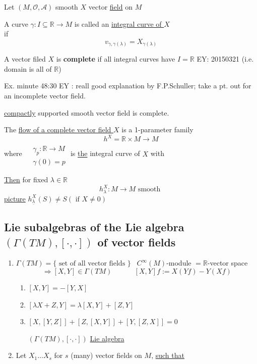 	Let $(M,\mathcal{O},\mathcal{A})$ smooth $X$ vector \underline{field} on $M$
	
	\begin{definition}
		A curve $\gamma :I \subseteq \mathbb{R} \to M$ is called an \underline{integral curve of $X$} \\
		if 
		\[
		v_{\gamma,\gamma(\lambda)} = X_{\gamma(\lambda)}
		\]
	\end{definition}
	
	\begin{definition} A vector filed $X$ is \textbf{complete} if all integral curves have $I = \mathbb{R}$ EY: 20150321 (i.e. domain is all of $\mathbb{R}$)
	\end{definition}
	
	Ex. minute 48:30 EY : reall good explanation by F.P.Schuller; take a pt. out for an incomplete vector field.
	
	\begin{theorem}
		\underline{compactly} supported smooth vector field is complete.  
	\end{theorem}
	
	\begin{definition} The \underline{flow of a complete vector field $X$} is a 1-parameter family
		\[
		h^X = \mathbb{R}\times M \to M
		\]
		where $\begin{aligned} & \quad \\ 
		& \gamma_p : \mathbb{R} \to M \\
		& \gamma(0) = p \end{aligned}$ is \underline{the} integral curve of $X$ with 
		
		\underline{Then} for fixed $\lambda \in \mathbb{R}$ 
		\[
		h_{\lambda}^X : M \to M \text{ smooth }
		\]
		\underline{picture}  $h^X_{\underline{\lambda}}(S) \neq S (\text{ if } X \neq 0 )$
	\end{definition}
	
	\subsection{Lie subalgebras of the Lie algebra $(\Gamma(TM) , [ \cdot , \cdot ] )$ of vector fields}
	
	\begin{enumerate}
		\item[(a)] $\Gamma(TM) = \lbrace \text{ set of all vector fields } \rbrace$ \quad \, $C^{\infty}(M)$-module $ = \mathbb{R}$-vector space \[
		\Longrightarrow [X,Y] \in \Gamma(TM) \quad \quad \quad \, [X,Y] f := X(Yf) - Y(Xf)
		\]
		\begin{enumerate}
			\item[(i)] $[X,Y] = -[Y,X]$ 
			\item[(ii)] $[\lambda X + Z, Y] = \lambda [X,Y] + [Z,Y]$
			\item[(iii)] $[X,[Y,Z]]  + [Z,[X,Y]] + [Y,[Z,X]] =0$ 
			
			$(\Gamma(TM), [\cdot, \cdot])$ \underline{Lie algebra}
		\end{enumerate}
		\item[(b)] Let $X_1\dots X_s$ for $s$ (many) vector fields on $M$, \underline{such that}
	\end{enumerate}
	
